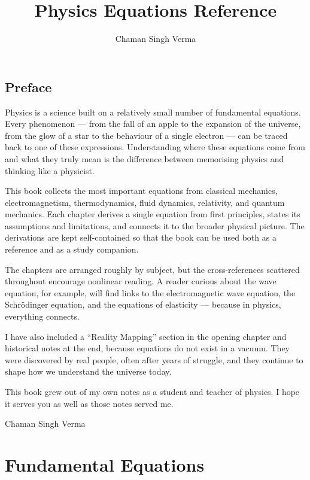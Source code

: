 \documentclass[11pt,openright]{book}
\title{Physics Equations Reference}
\author{Chaman Singh Verma}
\date{}
\begin{document}
\frontmatter
\maketitle

\chapter*{Preface}

Physics is a science built on a relatively small number of fundamental equations. Every phenomenon --- from the fall of an apple to the expansion of the universe, from the glow of a star to the behaviour of a single electron --- can be traced back to one of these expressions. Understanding where these equations come from and what they truly mean is the difference between memorising physics and thinking like a physicist.

This book collects the most important equations from classical mechanics, electromagnetism, thermodynamics, fluid dynamics, relativity, and quantum mechanics. Each chapter derives a single equation from first principles, states its assumptions and limitations, and connects it to the broader physical picture. The derivations are kept self-contained so that the book can be used both as a reference and as a study companion.

The chapters are arranged roughly by subject, but the cross-references scattered throughout encourage nonlinear reading. A reader curious about the wave equation, for example, will find links to the electromagnetic wave equation, the Schr\"odinger equation, and the equations of elasticity --- because in physics, everything connects.

I have also included a ``Reality Mapping'' section in the opening chapter and historical notes at the end, because equations do not exist in a vacuum. They were discovered by real people, often after years of struggle, and they continue to shape how we understand the universe today.

This book grew out of my own notes as a student and teacher of physics. I hope it serves you as well as those notes served me.

\vspace{2em}
\noindent
Chaman Singh Verma

\tableofcontents
\mainmatter

\part{Fundamental Equations}
\end{document}
